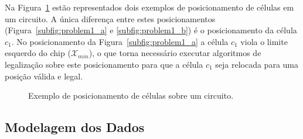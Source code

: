 Na Figura~\ref{fig:problem1} estão representados dois exemplos de posicionamento de células em um circuito.
A única diferença entre estes posicionamentos (Figura~\ref{subfig:problem1_a} e  \ref{subfig:problem1_b}) é o posicionamento da célula $c_1$.
No posicionamento da Figura~\ref{subfig:problem1_a} a célula $c_1$ viola o limite esquerdo do chip ($\mathcal{X}_{min}$), o que torna necessário executar algoritmos de legalização sobre este posicionamento para que a célula $c_1$ seja relocada para uma posição válida e legal.

\begin{figure}[ht]
    \centering
    \hspace{1cm}
    \caption{Exemplo de posicionamento de células sobre um circuito.}
    \label{fig:problem1}
\end{figure}

\subsection{Modelagem dos Dados}

